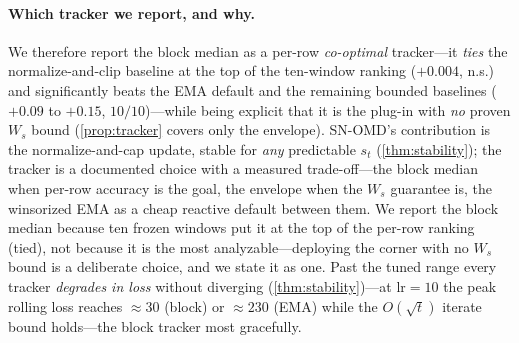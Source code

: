 \documentclass{article}
\begin{document}
\paragraph{Which tracker we report, and why.} We therefore report the block median as a
per-row \emph{co-optimal} tracker---it \emph{ties} the normalize-and-clip baseline at the top of
the ten-window ranking ($+0.004$, n.s.) and significantly beats the EMA default and the
remaining bounded baselines ($+0.09$ to $+0.15$, $10/10$)---while
being explicit that it is the plug-in with \emph{no} proven $W_s$ bound (\cref{prop:tracker}
covers only the envelope). SN-OMD's contribution is the normalize-and-cap update, stable for
\emph{any} predictable $s_t$ (\cref{thm:stability}); the tracker is a documented choice with a
measured trade-off---the block median when per-row accuracy is the goal, the envelope when the
$W_s$ guarantee is, the winsorized EMA as a cheap reactive default between them. We report
the block median because ten frozen windows put it at the top of the per-row ranking (tied),
not because it is the most analyzable---deploying the corner with no $W_s$ bound is a deliberate
choice, and we state it as one. Past the tuned range every tracker
\emph{degrades in loss} without diverging (\cref{thm:stability})---at $\mathrm{lr}{=}10$ the
peak rolling loss reaches $\approx30$ (block) or $\approx230$ (EMA) while the $O(\sqrt t)$
iterate bound holds---the block tracker most gracefully.
\end{document}
